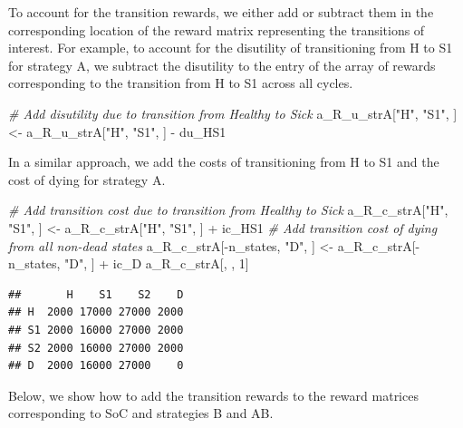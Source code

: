 \documentclass[
]{article}
\newenvironment{Shaded}{\begin{snugshade}}{\end{snugshade}}
\newcommand{\CommentTok}[1]{\textcolor[rgb]{0.56,0.35,0.01}{\textit{#1}}}
\newcommand{\DecValTok}[1]{\textcolor[rgb]{0.00,0.00,0.81}{#1}}
\newcommand{\NormalTok}[1]{#1}
\newcommand{\OtherTok}[1]{\textcolor[rgb]{0.56,0.35,0.01}{#1}}
\newcommand{\SpecialCharTok}[1]{\textcolor[rgb]{0.00,0.00,0.00}{#1}}
\newcommand{\StringTok}[1]{\textcolor[rgb]{0.31,0.60,0.02}{#1}}
\begin{document}
To account for the transition rewards, we either add or subtract them in the corresponding location of the reward matrix representing the transitions of interest. For example, to account for the disutility of transitioning from H to S1 for strategy A, we subtract the disutility to the entry of the array of rewards corresponding to the transition from H to S1 across all cycles.

\begin{Shaded}
\begin{Highlighting}[]
\CommentTok{\# Add disutility due to transition from Healthy to Sick}
\NormalTok{a\_R\_u\_strA[}\StringTok{"H"}\NormalTok{, }\StringTok{"S1"}\NormalTok{, ] }\OtherTok{\textless{}{-}}\NormalTok{ a\_R\_u\_strA[}\StringTok{"H"}\NormalTok{, }\StringTok{"S1"}\NormalTok{, ] }\SpecialCharTok{{-}}\NormalTok{ du\_HS1}
\end{Highlighting}
\end{Shaded}

In a similar approach, we add the costs of transitioning from H to S1 and the cost of dying for strategy A.

\begin{Shaded}
\begin{Highlighting}[]
\CommentTok{\# Add transition cost due to transition from Healthy to Sick}
\NormalTok{a\_R\_c\_strA[}\StringTok{"H"}\NormalTok{, }\StringTok{"S1"}\NormalTok{, ] }\OtherTok{\textless{}{-}}\NormalTok{ a\_R\_c\_strA[}\StringTok{"H"}\NormalTok{, }\StringTok{"S1"}\NormalTok{, ] }\SpecialCharTok{+}\NormalTok{ ic\_HS1}
\CommentTok{\# Add transition cost of dying from all non{-}dead states}
\NormalTok{a\_R\_c\_strA[}\SpecialCharTok{{-}}\NormalTok{n\_states, }\StringTok{"D"}\NormalTok{, ] }\OtherTok{\textless{}{-}}\NormalTok{ a\_R\_c\_strA[}\SpecialCharTok{{-}}\NormalTok{n\_states, }\StringTok{"D"}\NormalTok{, ] }\SpecialCharTok{+}\NormalTok{ ic\_D}
\NormalTok{a\_R\_c\_strA[, , }\DecValTok{1}\NormalTok{]}
\end{Highlighting}
\end{Shaded}

\begin{verbatim}
##       H    S1    S2    D
## H  2000 17000 27000 2000
## S1 2000 16000 27000 2000
## S2 2000 16000 27000 2000
## D  2000 16000 27000    0
\end{verbatim}

Below, we show how to add the transition rewards to the reward matrices corresponding to SoC and strategies B and AB.
\end{document}
